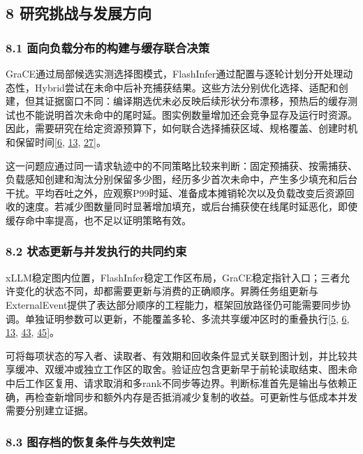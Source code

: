 \documentclass[UTF8,11pt,fontset=windows]{ctexart}
\begin{document}
\hypertarget{section-8}{%
\subsection{8 研究挑战与发展方向}\label{section-8}}

\hypertarget{section-8-1}{%
\subsubsection{8.1 面向负载分布的构建与缓存联合决策}\label{section-8-1}}

GraCE通过局部候选实测选择图模式，FlashInfer通过配置与逐轮计划分开处理动态性，Hybrid尝试在未命中后补充捕获结果。这些方法分别优化选择、适配和创建，但其证据窗口不同：编译期选优未必反映后续形状分布漂移，预热后的缓存测试也不能说明首次未命中的尾时延。图实例数量增加还会竞争显存及运行时资源。因此，需要研究在给定资源预算下，如何联合选择捕获区域、规格覆盖、创建时机和保留时间\protect\hyperlink{ref-6}{{[}6}, \protect\hyperlink{ref-13}{13}, \protect\hyperlink{ref-27}{27{]}}。

这一问题应通过同一请求轨迹中的不同策略比较来判断：固定预捕获、按需捕获、负载感知创建和淘汰分别保留多少图，经历多少首次未命中，产生多少填充和后台干扰。平均吞吐之外，应观察P99时延、准备成本摊销轮次以及负载改变后资源回收的速度。若减少图数量同时显著增加填充，或后台捕获使在线尾时延恶化，即使缓存命中率提高，也不足以证明策略有效。

\hypertarget{section-8-2}{%
\subsubsection{8.2 状态更新与并发执行的共同约束}\label{section-8-2}}

xLLM稳定图内位置，FlashInfer稳定工作区布局，GraCE稳定指针入口；三者允许变化的状态不同，却都需要更新与消费的正确顺序。昇腾任务组更新与ExternalEvent提供了表达部分顺序的工程能力，框架回放路径仍可能需要同步协调。单独证明参数可以更新，不能覆盖多轮、多流共享缓冲区时的重叠执行\protect\hyperlink{ref-5}{{[}5}, \protect\hyperlink{ref-6}{6}, \protect\hyperlink{ref-13}{13}, \protect\hyperlink{ref-43}{43}, \protect\hyperlink{ref-45}{45{]}}。

可将每项状态的写入者、读取者、有效期和回收条件显式关联到图计划，并比较共享缓冲、双缓冲或独立工作区的取舍。验证应包含更新早于前轮读取结束、图未命中后工作区复用、请求取消和多rank不同步等边界。判断标准首先是输出与依赖正确，再检查新增同步和额外内存是否抵消减少复制的收益。可更新性与低成本并发需要分别建立证据。

\hypertarget{section-8-3}{%
\subsubsection{8.3 图存档的恢复条件与失效判定}\label{section-8-3}}
\end{document}
